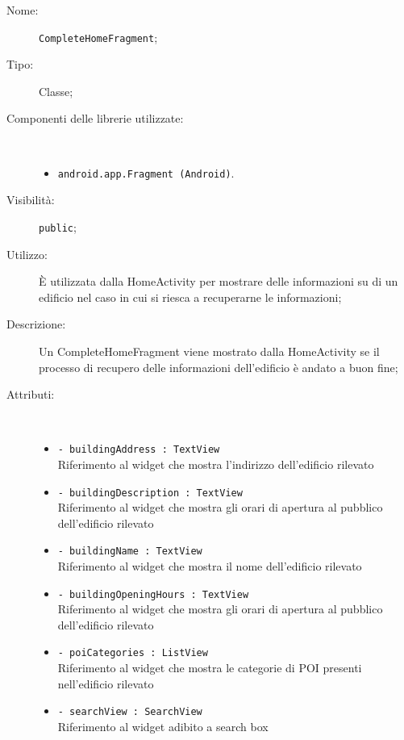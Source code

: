 \documentclass[../DefinizioneDiProdotto.tex]{subfiles}
\begin{document}
\begin{description}
	\item[Nome:] \texttt{CompleteHomeFragment};
	\item[Tipo:] Classe;
	\item[Componenti delle librerie utilizzate:] \
	\begin{itemize}
		\item \texttt{android.app.Fragment (Android)}.
		
	\end{itemize}
	\item[Visibilità:] \texttt{public};
	\item[Utilizzo:] È utilizzata dalla HomeActivity per mostrare delle informazioni su di un edificio nel caso in cui si riesca a recuperarne le informazioni;
	\item[Descrizione:] Un CompleteHomeFragment viene mostrato dalla HomeActivity se il processo di recupero delle informazioni dell'edificio è andato a buon fine;
	\item[Attributi:] \
	\begin{itemize}
		\item \texttt{- buildingAddress : TextView}\\
		Riferimento al widget che mostra l'indirizzo dell'edificio rilevato
		
		\item \texttt{- buildingDescription : TextView}\\
		Riferimento al widget che mostra gli orari di apertura al pubblico dell'edificio rilevato
		
		\item \texttt{- buildingName : TextView}\\
		Riferimento al widget che mostra il nome dell'edificio rilevato
		
		\item \texttt{- buildingOpeningHours : TextView}\\
		Riferimento al widget che mostra gli orari di apertura al pubblico dell'edificio rilevato
		
		\item \texttt{- poiCategories : ListView}\\
		Riferimento al widget che mostra le categorie di POI presenti nell'edificio rilevato
		
		\item \texttt{- searchView : SearchView}\\
		Riferimento al widget adibito a search box
		

\end{itemize}
\end{description}
\end{document}
